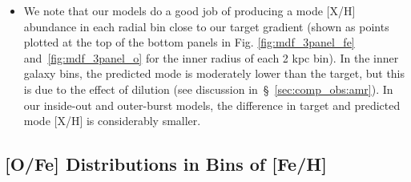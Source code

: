\documentclass[fleqn, usenatbib]{mnras}
\begin{document}
\begin{itemize}
	\item We note that our models do a good job of producing a mode [X/H] 
	abundance in each radial bin close to our target gradient (shown as 
	points plotted at the top of the bottom panels in Fig. 
	\ref{fig:mdf_3panel_fe} and~\ref{fig:mdf_3panel_o} for the inner radius of 
	each 2 kpc bin). In the inner galaxy bins, the predicted mode is 
	moderately lower than the target, but this is due to the effect of 
	dilution (see discussion in~\S~\ref{sec:comp_obs:amr}). In our inside-out 
	and outer-burst models, the difference in target and predicted mode [X/H] 
	is considerably smaller. 
\end{itemize} 

\subsection{[O/Fe] Distributions in Bins of [Fe/H]} 
\label{sec:comp_obs:mdfs:ofe} 
\end{document}
